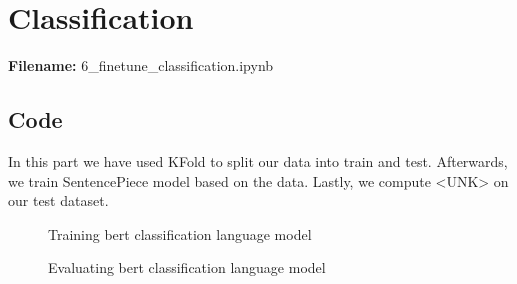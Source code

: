 \documentclass[12pt, a4paper]{article}
\begin{document}
\section*{Classification}
\large{\textbf{Filename:} 6\_finetune\_classification.ipynb}

\subsection*{Code}
In this part we have used KFold to split our data into train and test. Afterwards, we train SentencePiece model based on the data. Lastly, we compute <UNK> on our test dataset. 

\begin{figure}[H]
	\caption{Training bert classification language model}
	\label{classification-lm_train}
\end{figure}

\begin{figure}[H]
	\caption{Evaluating bert classification language model}
	\label{classification-lm_eval}
\end{figure}
\end{document}
